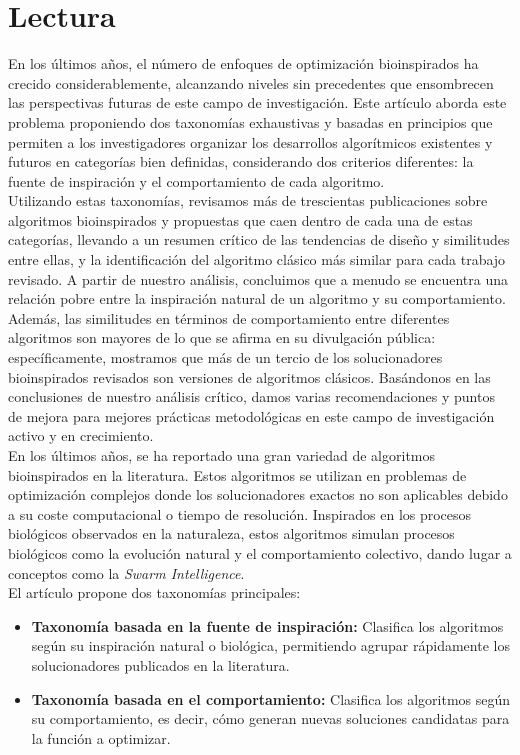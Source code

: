 \documentclass{report}
\begin{document}
    \section{Lectura}
    En los últimos años, el número de enfoques de optimización bioinspirados ha crecido considerablemente, alcanzando niveles sin precedentes que ensombrecen las perspectivas 
    futuras de este campo de investigación. Este artículo aborda este problema proponiendo dos taxonomías exhaustivas y basadas en principios que permiten a los investigadores 
    organizar los desarrollos algorítmicos existentes y futuros en categorías bien definidas, considerando dos criterios diferentes: la fuente de inspiración y el comportamiento de cada algoritmo.\\ 
    Utilizando estas taxonomías, revisamos más de trescientas publicaciones sobre algoritmos bioinspirados y propuestas que caen dentro de cada una de estas categorías, llevando a un resumen crítico de las tendencias 
    de diseño y similitudes entre ellas, y la identificación del algoritmo clásico más similar para cada trabajo revisado. A partir de nuestro análisis, concluimos que a menudo se encuentra una relación pobre entre 
    la inspiración natural de un algoritmo y su comportamiento. Además, las similitudes en términos de comportamiento entre diferentes algoritmos son mayores de lo que se afirma en su divulgación pública: específicamente, 
    mostramos que más de un tercio de los solucionadores bioinspirados revisados son versiones de algoritmos clásicos. Basándonos en las conclusiones de nuestro análisis crítico, damos varias recomendaciones y puntos de mejora para mejores 
    prácticas metodológicas en este campo de investigación activo y en crecimiento.\\
    En los últimos años, se ha reportado una gran variedad de algoritmos bioinspirados en la literatura. 
    Estos algoritmos se utilizan en problemas de optimización complejos donde los solucionadores exactos no son aplicables debido a su coste computacional o tiempo de resolución. Inspirados en los procesos biológicos observados en la naturaleza, 
    estos algoritmos simulan procesos biológicos como la evolución natural y el comportamiento colectivo, dando lugar a conceptos como la \textit{Swarm Intelligence}.\\

    El artículo propone dos taxonomías principales:
    \begin{itemize}
    \item \textbf{Taxonomía basada en la fuente de inspiración:} Clasifica los algoritmos según su inspiración natural o biológica, permitiendo agrupar rápidamente los solucionadores publicados en la literatura.
    \item \textbf{Taxonomía basada en el comportamiento:} Clasifica los algoritmos según su comportamiento, es decir, cómo generan nuevas soluciones candidatas para la función a optimizar.
    \end{itemize}
\end{document}
